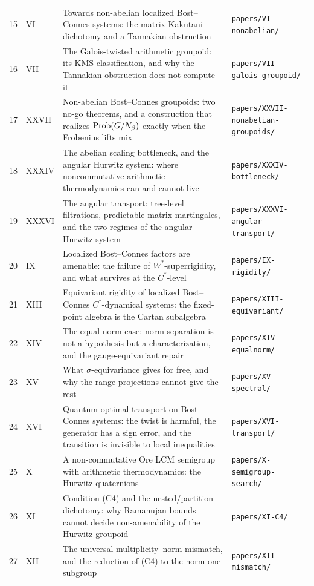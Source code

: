 \begin{center}
\begin{longtable}{rlp{7.4cm}p{4.6cm}}
15 & VI & Towards non-abelian localized Bost--Connes systems:  the matrix Kakutani dichotomy and a Tannakian obstruction & \nolinkurl{papers/VI-nonabelian/}\\
16 & VII & The Galois-twisted arithmetic groupoid:  its KMS classification, and why the Tannakian obstruction  does not compute it & \nolinkurl{papers/VII-galois-groupoid/}\\
17 & XXVII & Non-abelian Bost--Connes groupoids:  two no-go theorems, and a construction that realizes $\mathrm{Prob}(G/N_\beta)$  exactly when the Frobenius lifts mix & \nolinkurl{papers/XXVII-nonabelian-groupoids/}\\
18 & XXXIV & The abelian scaling bottleneck, and the angular Hurwitz system:  where noncommutative arithmetic thermodynamics can and cannot live & \nolinkurl{papers/XXXIV-bottleneck/}\\
19 & XXXVI & The angular transport: tree-level filtrations, predictable matrix martingales,  and the two regimes of the angular Hurwitz system & \nolinkurl{papers/XXXVI-angular-transport/}\\
20 & IX & Localized Bost--Connes factors are amenable:  the failure of $W^*$-superrigidity,  and what survives at the $C^*$-level & \nolinkurl{papers/IX-rigidity/}\\
21 & XIII & Equivariant rigidity of localized Bost--Connes  $C^*$-dynamical systems: the fixed-point algebra  is the Cartan subalgebra & \nolinkurl{papers/XIII-equivariant/}\\
22 & XIV & The equal-norm case: norm-separation is not a hypothesis  but a characterization, and the gauge-equivariant repair & \nolinkurl{papers/XIV-equalnorm/}\\
23 & XV & What $\sigma$-equivariance gives for free,  and why the range projections cannot give the rest & \nolinkurl{papers/XV-spectral/}\\
24 & XVI & Quantum optimal transport on Bost--Connes systems:  the twist is harmful, the generator has a sign error,  and the transition is invisible to local inequalities & \nolinkurl{papers/XVI-transport/}\\
25 & X & A non-commutative Ore LCM semigroup  with arithmetic thermodynamics:  the Hurwitz quaternions & \nolinkurl{papers/X-semigroup-search/}\\
26 & XI & Condition \textup{(C4)} and the nested/partition dichotomy:  why Ramanujan bounds cannot decide  non-amenability of the Hurwitz groupoid & \nolinkurl{papers/XI-C4/}\\
27 & XII & The universal multiplicity--norm mismatch,  and the reduction of \textup{(C4)} to the norm-one subgroup & \nolinkurl{papers/XII-mismatch/}\\

\end{longtable}
\end{center}
